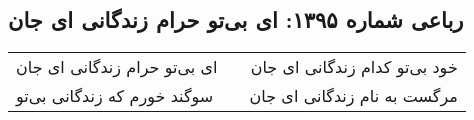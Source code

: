\begin{center}
\section*{رباعی شماره ۱۳۹۵: ای بی‌تو حرام زندگانی ای جان}
\label{sec:1395}
\begin{longtable}{l p{0.5cm} r}
ای بی‌تو حرام زندگانی ای جان
&&
خود بی‌تو کدام زندگانی ای جان
\\
سوگند خورم که زندگانی بی‌تو
&&
مرگست به نام زندگانی ای جان
\\
\end{longtable}
\end{center}
